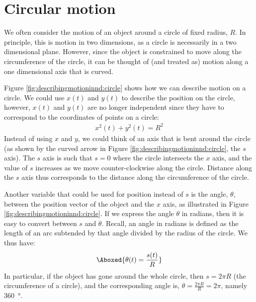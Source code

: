 \section{Circular motion}
We often consider the motion of an object around a circle of fixed radius, $R$. In principle, this is motion in two dimensions, as a circle is necessarily in a two dimensional plane. However, since the object is constrained to move along the circumference of the circle, it can be thought of (and treated as) motion along a one dimensional axis that is curved. 

Figure \ref{fig:describingmotioninnd:circle} shows how we can describe motion on a circle. We could use $x(t)$ and $y(t)$ to describe the position on the circle, however, $x(t)$ and $y(t)$ are no longer independent since they have to correspond to the coordinates of points on a circle:
\begin{align*}
x^2(t)+y^2(t)=R^2
\end{align*}
Instead of using $x$ and $y$, we could think of an axis that is bent around the circle (as shown by the curved arrow in Figure \ref{fig:describingmotioninnd:circle}, the $s$ axis). The $s$ axis is such that $s=0$ where the circle intersects the $x$ axis, and the value of $s$ increases as we move counter-clockwise along the circle. Distance along the $s$ axis thus corresponds to the distance along the circumference of the circle.

Another variable that could be used for position instead of $s$ is the angle, $\theta$, between the position vector of the object and the $x$ axis, as illustrated in Figure \ref{fig:describingmotioninnd:circle}. If we express the angle $\theta$ in radians, then it is easy to convert between $s$ and $\theta$. Recall, an angle in radians is defined as the length of an arc subtended by that angle divided by the radius of the circle. We thus have:
\begin{align}
\label{eqn:describingmotioninnd:raddef}
\Aboxed{\theta(t)=\frac{s(t)}{R}}
\end{align}
In particular, if the object has gone around the whole circle, then $s=2\pi R$ (the circumference of a circle), and the corresponding angle is, $\theta=\frac{2\pi R}{R}=2\pi$, namely \SI{360}{\degree}. 

